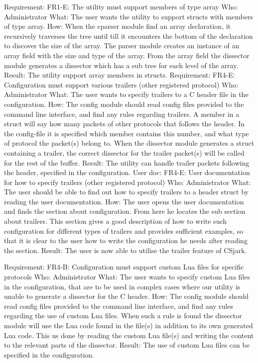 Requirement: FR1-E: The utility must support members of type array
Who: Administrator
What: The user wants the utility to support structs with members of type array.
How: When the cparser module find an array declaration, it recursively traverses the tree until till it encounters the bottom of the declaration to discover the size of the array. The parser module creates an instance of an array field with the size and type of the array. From the array field the dissector module generates a dissector which has a sub tree for each level of the array.
Result: The utility support array members in structs.
Requirement: FR4-E: Configuration must support various trailers (other registered protocol)
Who: Administrator 
What: The user wants to specify trailers to a C header file in the configuration.
How: The config module should read config files provided to the command line interface, and find any rules regarding trailers. A member in a struct will say how many packets of other protocols that follows the header. In the config-file it is specified which member contains this number, and what type of protocol the packet(s) belong to. When the dissector module generates a struct containing a trailer, the correct dissector for the trailer packet(s) will be called for the rest of the buffer.
Result: The utility can handle trailer packets following the header, specified in the configuration.
User doc: FR4-E: User documentation for how to specify trailers (other registered protocol)
Who: Administrator 
What: The user should be able to find out how to specify trailers to a header struct by reading the user documentation.
How: The user opens the user documentation and finds the section about configuration. From here he locates the sub section about trailers. This section gives a good description of how to write such configuration for different types of trailers and provides sufficient examples, so that it is  clear to the user how to write the configuration he needs after reading the section.
Result: The user is now able to utilise the trailer feature of CSjark.

Requirement: FR4-B: Configuration must support custom Lua files for specific protocols
Who: Administrator
What: The user wants to specify custom Lua files in the configuration, that are to be used in complex cases where our utility is unable to generate a dissector for the C header.
How: The config module should read config files provided to the command line interface, and find any rules regarding the use of custom Lua files. When such a rule is found the dissector module will use the Lua code found in the file(s) in addition to its own generated Lua code.
This us done by reading the custom Lua file(s) and writing the content to the relevant parts of the dissector.
Result: The use of custom Lua files can be specified in the configuration.

